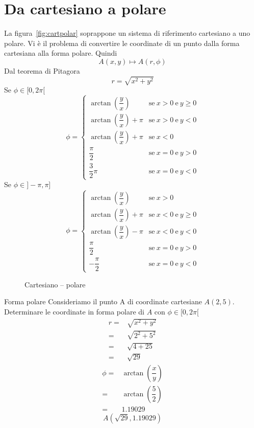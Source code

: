 \section{Da cartesiano a polare}
La figura~\vref{fig:cartpolar} soprappone un sistema di riferimento cartesiano a uno polare. Vi è il problema di convertire le coordinate di un punto dalla forma cartesiana alla forma polare. Quindi 
\[A(x,y)\mapsto A(r,\phi) \]
Dal teorema di Pitagora \[r=\sqrt{x^2+y^2} \]
Se $\phi\in[0,2\pi[$
\[\phi=\begin{cases}
\arctan(\dfrac{y}{x})&\text{se}\ x>0 \ \text{e} \ y\geq0\\[8pt]
\arctan(\dfrac{y}{x})+\pi&\text{se}\ x>0 \ \text{e} \ y<0\\[8pt]
\arctan(\dfrac{y}{x})+\pi&\text{se}\ x<0\\[8pt]
\dfrac{\pi}{2}&\text{se}\ x=0 \ \text{e} \ y>0\\[8pt]
\dfrac{3}{2}\pi&\text{se}\ x=0 \ \text{e} \ y<0
\end{cases} 
\] 
Se $\phi\in]-\pi,\pi]$
\[\phi=\begin{cases}
\arctan(\dfrac{y}{x})&\text{se}\ x>0 \\[8pt]
\arctan(\dfrac{y}{x})+\pi&\text{se}\ x<0 \ \text{e} \ y\geq0\\[8pt]
\arctan(\dfrac{y}{x})-\pi&\text{se}\ x<0\ \text{e} \ y<0\\[8pt]
\dfrac{\pi}{2}&\text{se}\ x=0 \ \text{e} \ y>0\\[8pt]
-\dfrac{\pi}{2}&\text{se}\ x=0 \ \text{e} \ y<0
\end{cases} 
\]
\begin{figure} %
	\centering
	
	\caption{Cartesiano -- polare}\label{fig:cartpolar}
\end{figure}
\begin{esempiot}{Forma polare}{} Consideriamo il punto A di coordinate cartesiane $A(2,5)$. Determinare le coordinate in forma polare di $A$ con $\phi\in[0,2\pi[$
	\begin{align*}
	r=&\sqrt{x^2+y^2}\\
	=&\sqrt{2^2+5^2}\\
	=&\sqrt{4+25}\\
	=&\sqrt{29}
	\end{align*}
	\begin{align*}
	\phi=&\arctan\left(\dfrac{x}{y}\right)\\
		 =&\arctan\left(\dfrac{5}{2}\right)\\
	=&1.19029
	\end{align*}
	\[A(\sqrt{29},1.19029) \]
\end{esempiot}
